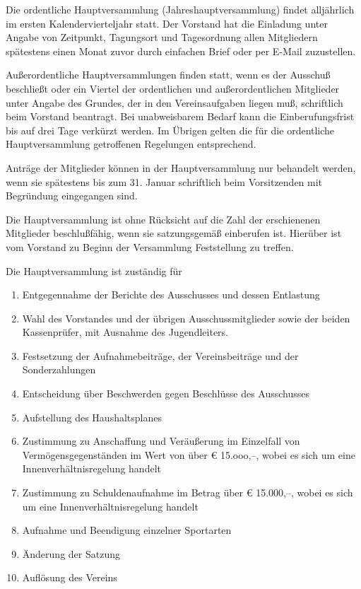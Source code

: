 \documentclass[10pt,a4paper,parskip=half]{scrartcl}
\begin{document}
\begin{contract}
    \label{C:Hauptversammlung}
    Die ordentliche Hauptversammlung (Jahreshauptversammlung) findet alljährlich im ersten Kalendervierteljahr statt.
    Der Vorstand hat die Einladung unter Angabe von Zeitpunkt,
    Tagungsort und Tagesordnung allen Mitgliedern spätestens einen Monat zuvor durch einfachen Brief oder per E-Mail zuzustellen.
    
    Außerordentliche Hauptversammlungen finden statt,
    wenn es der Ausschuß beschließt oder ein Viertel der ordentlichen und außerordentlichen Mitglieder unter Angabe des Grundes,
    der in den Vereinsaufgaben liegen muß,
    schriftlich beim Vorstand beantragt.
    Bei unabweisbarem Bedarf kann die Einberufungsfrist bis auf drei Tage verkürzt werden.
    Im Übrigen gelten die für die ordentliche Hauptversammlung getroffenen Regelungen entsprechend.
    
    Anträge der Mitglieder können in der Haupt\-ver\-samm\-lung nur behandelt werden,
    wenn sie spätestens bis zum 31. Januar schriftlich beim Vorsitzenden mit Begründung eingegangen sind.
    
    Die Hauptversammlung ist ohne Rücksicht auf die Zahl der erschienenen Mitglieder beschlußfähig,
    wenn sie satzungsgemäß einberufen ist.
    Hierüber ist vom Vorstand zu Beginn der Versammlung Feststellung zu treffen.
    
    Die Hauptversammlung ist zuständig für
    \begin{enumerate}[label=\alph*),noitemsep]
      \item Entgegennahme der Berichte des Ausschusses und dessen Entlastung
      \item Wahl des Vorstandes und der übrigen Ausschussmitglieder sowie der beiden Kassenprüfer,
            mit Ausnahme des Jugendleiters.
      \item Festsetzung der Aufnahmebeiträge,
            der Vereinsbeiträge und der Sonderzahlungen
      \item Entscheidung über Beschwerden gegen Beschlüsse des Ausschusses
      \item Aufstellung des Haushaltsplanes
      \item Zustimmung zu Anschaffung und Veräußerung im Einzelfall von Vermögensgegenständen im Wert von über € 15.ooo,--,
            wobei es sich um eine Innenverhältnisregelung handelt
      \item Zustimmung zu Schuldenaufnahme im Betrag über € 15.000,--,
            wobei es sich um eine Innenverhältnisregelung handelt
      \item Aufnahme und Beendigung einzelner Sportarten
      \item Änderung der Satzung
      \item Auflösung des Vereins
    \end{enumerate}
    

\end{contract}
\end{document}
